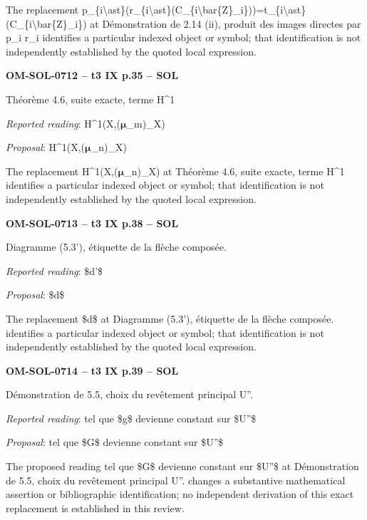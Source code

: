 The replacement p\_\{i\textbackslash{}ast\}(r\_\{i\textbackslash{}ast\}(C\_\{i\textbackslash{}bar\{Z\}\_i\}))=\allowbreak t\_\{i\textbackslash{}ast\}(C\_\{i\textbackslash{}bar\{Z\}\_i\}) at Démonstration de 2.14 (ii), produit des images directes par p\_i r\_i identifies a particular indexed object or symbol; that identification is not independently established by the quoted local expression.\par
\par\noindent\textbf{OM-SOL-0712 -- t3 IX p.35 -- SOL}\par
Théorème 4.6, suite exacte, terme H\textasciicircum{}1\par
\emph{Reported reading}: H\textasciicircum{}1(X,(\ensuremath{𝛍}\_m)\_X)\par
\emph{Proposal}: H\textasciicircum{}1(X,(\ensuremath{𝛍}\_n)\_X)\par
The replacement H\textasciicircum{}1(X,(\ensuremath{𝛍}\_n)\_X) at Théorème 4.6, suite exacte, terme H\textasciicircum{}1 identifies a particular indexed object or symbol; that identification is not independently established by the quoted local expression.\par
\par\noindent\textbf{OM-SOL-0713 -- t3 IX p.38 -- SOL}\par
Diagramme (5.3'), étiquette de la flèche composée.\par
\emph{Reported reading}: \$d'\$\par
\emph{Proposal}: \$d\$\par
The replacement \$d\$ at Diagramme (5.3'), étiquette de la flèche composée. identifies a particular indexed object or symbol; that identification is not independently established by the quoted local expression.\par
\par\noindent\textbf{OM-SOL-0714 -- t3 IX p.39 -- SOL}\par
Démonstration de 5.5, choix du revêtement principal U''.\par
\emph{Reported reading}: tel que \$g\$ devienne constant sur \$U''\$\par
\emph{Proposal}: tel que \$G\$ devienne constant sur \$U''\$\par
The proposed reading tel que \$G\$ devienne constant sur \$U''\$ at Démonstration de 5.5, choix du revêtement principal U''. changes a substantive mathematical assertion or bibliographic identification; no independent derivation of this exact replacement is established in this review.\par
